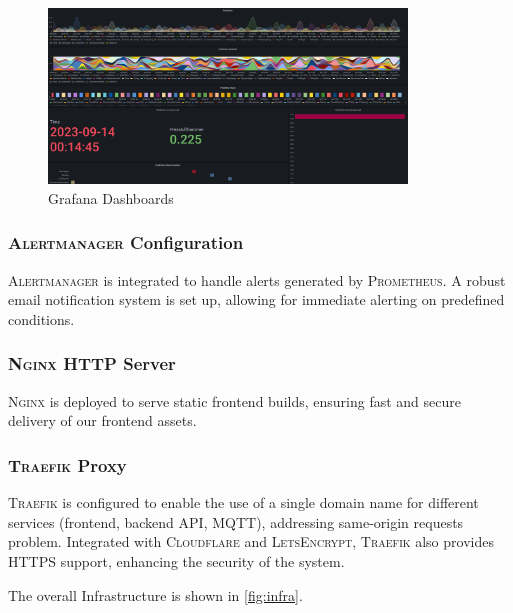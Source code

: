 \begin{figure}[htbp]
  \centering
  \includegraphics[width=0.85\textwidth]{Pictures/grafana}
  \caption{\label{fig:grafana}Grafana Dashboards}
\end{figure}

\subsubsection{\textsc{Alertmanager} Configuration}
\textsc{Alertmanager} is integrated to handle alerts generated by \textsc{Prometheus}. A robust email notification system is set up, allowing for immediate alerting on predefined conditions.

\subsubsection{\textsc{Nginx} HTTP Server}
\textsc{Nginx} is deployed to serve static frontend builds, ensuring fast and secure delivery of our frontend assets.

\subsubsection{\textsc{Traefik} Proxy}
\textsc{Traefik} is configured to enable the use of a single domain name for different services (frontend, backend API, MQTT), addressing same-origin requests problem. Integrated with \textsc{Cloudflare} and \textsc{LetsEncrypt}, \textsc{Traefik} also provides HTTPS support, enhancing the security of the system.

The overall Infrastructure is shown in \ref{fig:infra}.

